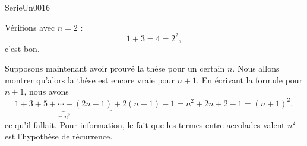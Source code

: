 

\begin{corrige}{SerieUn0016}

	Vérifions avec $n=2$ :
	\begin{equation}
		1+3=4=2^2,
	\end{equation}
	c'est bon.

	Supposons maintenant avoir prouvé la thèse pour un certain $n$. Nous allons montrer qu'alors la thèse est encore vraie pour $n+1$. En écrivant la formule pour $n+1$, nous avons
	\begin{equation}
        \underbrace{1+3+5+\cdots+(2n-1)}_{=n^2}+2(n+1)-1=n^2+2n+2-1=(n+1)^2,
	\end{equation}
	ce qu'il fallait. Pour information, le fait que les termes entre accolades valent \( n^2\) est l'hypothèse de récurrence.

\end{corrige}
